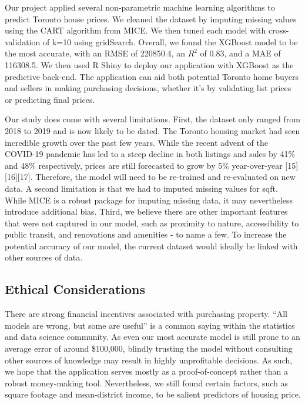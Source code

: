 \documentclass[11pt,]{article}
\begin{document}
Our project applied several non-parametric machine learning algorithms
to predict Toronto house prices. We cleaned the dataset by imputing
missing values using the CART algorithm from MICE. We then tuned each
model with cross-validation of k=10 using gridSearch. Overall, we found
the XGBoost model to be the most accurate, with an RMSE of 220850.4, an
\(R^2\) of 0.83, and a MAE of 116308.5. We then used R Shiny to deploy
our application with XGBoost as the predictive back-end. The application
can aid both potential Toronto home buyers and sellers in making
purchasing decisions, whether it's by validating list prices or
predicting final prices.

Our study does come with several limitations. First, the dataset only
ranged from 2018 to 2019 and is now likely to be dated. The Toronto
housing market had seen incredible growth over the past few years. While
the recent advent of the COVID-19 pandemic has led to a steep decline in
both listings and sales by 41\% and 48\% respectively, prices are still
forecasted to grow by 5\% year-over-year {[}15{]}{[}16{]}{[}17{]}.
Therefore, the model will need to be re-trained and re-evaluated on new
data. A second limitation is that we had to imputed missing values for
sqft. While MICE is a robust package for imputing missing data, it may
nevertheless introduce additional bias. Third, we believe there are
other important features that were not captured in our model, such as
proximity to nature, accessibility to public transit, and renovations
and amenities - to name a few. To increase the potential accuracy of our
model, the current dataset would ideally be linked with other sources of
data.

\hypertarget{ethical-considerations}{%
\subsection{Ethical Considerations}\label{ethical-considerations}}

There are strong financial incentives associated with purchasing
property. ``All models are wrong, but some are useful'' is a common
saying within the statistics and data science community. As even our
most accurate model is still prone to an average error of around
\$100,000, blindly trusting the model without consulting other sources
of knowledge may result in highly unprofitable decisions. As such, we
hope that the application serves mostly as a proof-of-concept rather
than a robust money-making tool. Nevertheless, we still found certain
factors, such as square footage and mean-district income, to be salient
predictors of housing price.
\end{document}
